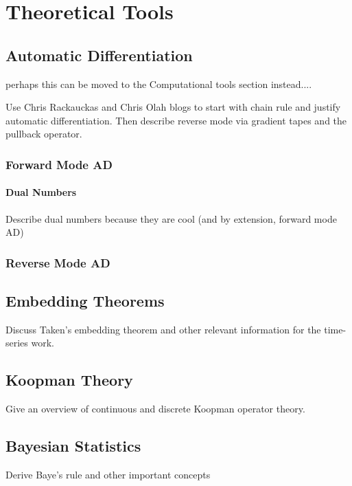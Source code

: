 \chapter{Theoretical Tools}



\section{Automatic Differentiation}

perhaps this can be moved to the Computational tools section instead....

Use Chris Rackauckas and Chris Olah blogs to start with chain rule and justify automatic differentiation. Then describe reverse mode via gradient tapes and the pullback operator.

\subsection{Forward Mode AD}
\subsubsection{Dual Numbers}

Describe dual numbers because they are cool (and by extension, forward mode AD)

\subsection{Reverse Mode AD}




\section{Embedding Theorems}
Discuss Taken's embedding theorem and other relevant information for the time-series work.

\section{Koopman Theory}
Give an overview of continuous and discrete Koopman operator theory.





\section{Bayesian Statistics}
Derive Baye's rule and other important concepts

